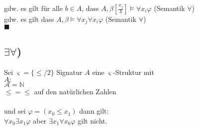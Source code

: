 gdw. es gilt für alle $b \in A$, dass $A,\beta[\frac{x_j}{b}] \vDash \forall x_i \varphi$ (Semantik $\forall$)\\

gdw. es gilt dass $A,\beta \vDash \forall x_j \forall x_i \varphi$ (Semantik $\forall$)\\
$\blacksquare$

\subsection*{$\exists \forall$)}
Sei $\varsigma=\{\leq/2\}$ Signatur $A$ eine $\varsigma$-Struktur mit\\ $A:$\\
$\mathcal{A}=\mathbb{N}$\\
 $\leq =  \leq$ auf den natürlichen Zahlen\\
\\
 und sei $\varphi = (x_0 \leq x_1)$ dann gilt:\\
$\forall x_0 \exists x_1 \varphi$ aber $\exists x_1 \forall x_0 \varphi$ gilt nicht. 
 

